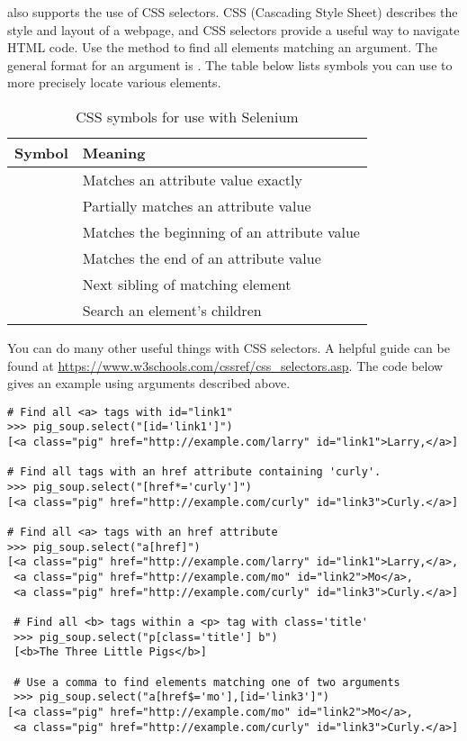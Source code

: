  also supports the use of CSS selectors.
CSS (Cascading Style Sheet) describes the style and layout of a webpage, and CSS selectors provide a useful way to navigate HTML code.
Use the method  to find all elements matching an argument.
The general format for an argument is .
The table below lists symbols you can use to more precisely locate various elements.

\begin{table}[H]
\centering
\begin{tabular}{c|l}
    Symbol & Meaning \\ \hline
    \li{=} & Matches an attribute value exactly \\
    \li{*=} & Partially matches an attribute value \\
    \li{\^=} & Matches the beginning of an attribute value \\
    \li{\$=} & Matches the end of an attribute value \\
    \li{+} & Next sibling of matching element \\
    \li{>} & Search an element's children \\
\end{tabular}
\caption{CSS symbols for use with Selenium}
\label{table:selenium-css-selectors} %
\end{table}

You can do many other useful things with CSS selectors.
A helpful guide can be found at \url{https://www.w3schools.com/cssref/css_selectors.asp}.
The code below gives an example using arguments described above.

\begin{lstlisting}
# Find all <a> tags with id="link1"
>>> pig_soup.select("[id='link1']")
[<a class="pig" href="http://example.com/larry" id="link1">Larry,</a>]

# Find all tags with an href attribute containing 'curly'.
>>> pig_soup.select("[href*='curly']")
[<a class="pig" href="http://example.com/curly" id="link3">Curly.</a>]

# Find all <a> tags with an href attribute
>>> pig_soup.select("a[href]")
[<a class="pig" href="http://example.com/larry" id="link1">Larry,</a>,
 <a class="pig" href="http://example.com/mo" id="link2">Mo</a>,
 <a class="pig" href="http://example.com/curly" id="link3">Curly.</a>]
 
 # Find all <b> tags within a <p> tag with class='title'
 >>> pig_soup.select("p[class='title'] b")
 [<b>The Three Little Pigs</b>]
 
 # Use a comma to find elements matching one of two arguments
 >>> pig_soup.select("a[href$='mo'],[id='link3']")
[<a class="pig" href="http://example.com/mo" id="link2">Mo</a>,
 <a class="pig" href="http://example.com/curly" id="link3">Curly.</a>]
\end{lstlisting}

